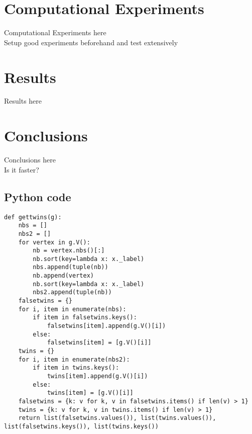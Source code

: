 \documentclass[twoside]{article}
\theoremstyle{definition}
\theoremstyle{plain}
\begin{document}
\begin{multicols}{2}

\section{Computational Experiments}

Computational Experiments here\\
Setup good experiments beforehand and test extensively

\section{Results}

Results here

\section{Conclusions}

Conclusions here \\
Is it faster?


\printbibliography




\end{multicols}
\begin{appendices}

\section{Python code}
\lstset{language=Python}
\begin{lstlisting}[label={gettwins}]
def gettwins(g):
    nbs = []
    nbs2 = []
    for vertex in g.V():
        nb = vertex.nbs()[:]
        nb.sort(key=lambda x: x._label)
        nbs.append(tuple(nb))
        nb.append(vertex)
        nb.sort(key=lambda x: x._label)
        nbs2.append(tuple(nb))
    falsetwins = {}
    for i, item in enumerate(nbs):
        if item in falsetwins.keys():
            falsetwins[item].append(g.V()[i])
        else:
            falsetwins[item] = [g.V()[i]]
    twins = {}
    for i, item in enumerate(nbs2):
        if item in twins.keys():
            twins[item].append(g.V()[i])
        else:
            twins[item] = [g.V()[i]]
    falsetwins = {k: v for k, v in falsetwins.items() if len(v) > 1}
    twins = {k: v for k, v in twins.items() if len(v) > 1}
    return list(falsetwins.values()), list(twins.values()), list(falsetwins.keys()), list(twins.keys())   
\end{lstlisting}
\end{appendices}
\end{document}

